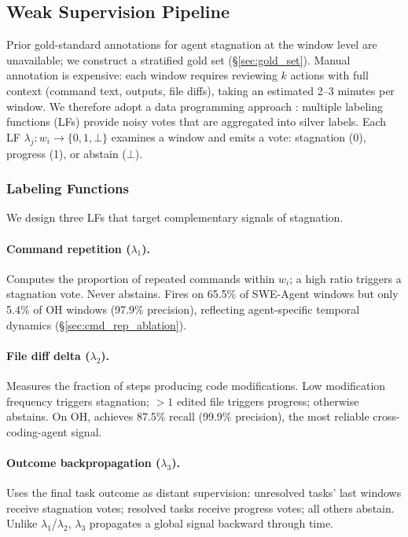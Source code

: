 \subsection{Weak Supervision Pipeline}
\label{sec:weak_supervision}

Prior gold-standard annotations for agent stagnation at the window level are unavailable; we construct a stratified gold set (\S\ref{sec:gold_set}).
Manual annotation is expensive: each window requires reviewing $k$ actions with full context (command text, outputs, file diffs), taking an estimated 2--3 minutes per window.
We therefore adopt a data programming approach \citep{ratner2016dataprogramming,ratner2019snorkel}: multiple labeling functions (LFs) provide noisy votes that are aggregated into silver labels.
Each LF $\lambda_j : w_i \to \{0, 1, \bot\}$ examines a window and emits a vote: stagnation (0), progress (1), or abstain ($\bot$).

\subsubsection{Labeling Functions}
\label{sec:labeling_functions}

We design three LFs that target complementary signals of stagnation.

\paragraph{Command repetition ($\lambda_1$).}
Computes the proportion of repeated commands within $w_i$; a high ratio triggers a stagnation vote.
Never abstains.
Fires on 65.5\% of SWE-Agent windows but only 5.4\% of OH windows (97.9\% precision), reflecting agent-specific temporal dynamics (\S\ref{sec:cmd_rep_ablation}).

\paragraph{File diff delta ($\lambda_2$).}
Measures the fraction of steps producing code modifications.
Low modification frequency triggers stagnation; ${>}1$ edited file triggers progress; otherwise abstains.
On OH, achieves 87.5\% recall (99.9\% precision), the most reliable cross-coding-agent signal.

\paragraph{Outcome backpropagation ($\lambda_3$).}
Uses the final task outcome as distant supervision: unresolved tasks' last windows receive stagnation votes; resolved tasks receive progress votes; all others abstain.
Unlike $\lambda_1$/$\lambda_2$, $\lambda_3$ propagates a global signal backward through time.


